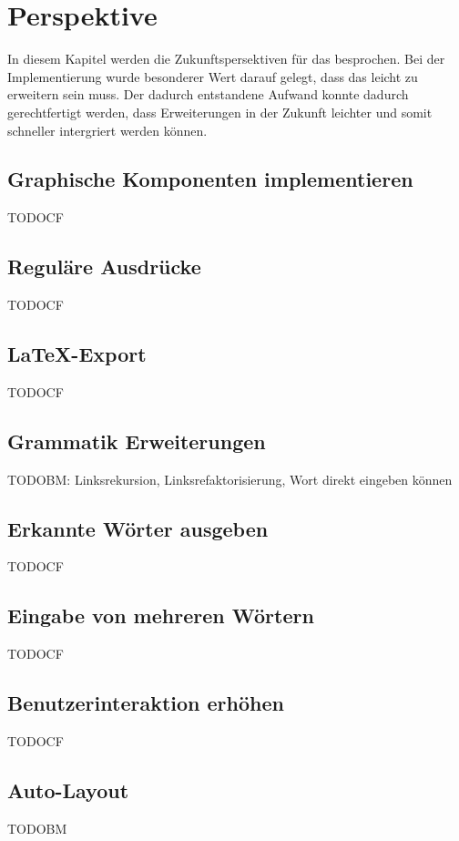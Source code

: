 

\chapter{Perspektive}\label{Perspective}

In diesem Kapitel werden die Zukunftspersektiven für das \gtitool besprochen.
Bei der Implementierung wurde besonderer Wert darauf gelegt, dass das \gtitool
leicht zu erweitern sein muss. Der dadurch entstandene Aufwand konnte dadurch
gerechtfertigt werden, dass Erweiterungen in der Zukunft leichter und somit
schneller intergriert werden können.


\section{Graphische Komponenten implementieren}\label{PerspectiveGraphics}

TODOCF


\section{Reguläre Ausdrücke}

TODOCF


\section{\LaTeX-Export}

TODOCF


\section{Grammatik Erweiterungen}

TODOBM: Linksrekursion, Linksrefaktorisierung, Wort direkt eingeben können


\section{Erkannte Wörter ausgeben}

TODOCF


\section{Eingabe von mehreren Wörtern}

TODOCF


\section{Benutzerinteraktion erhöhen}

TODOCF


\section{Auto-Layout}

TODOBM
